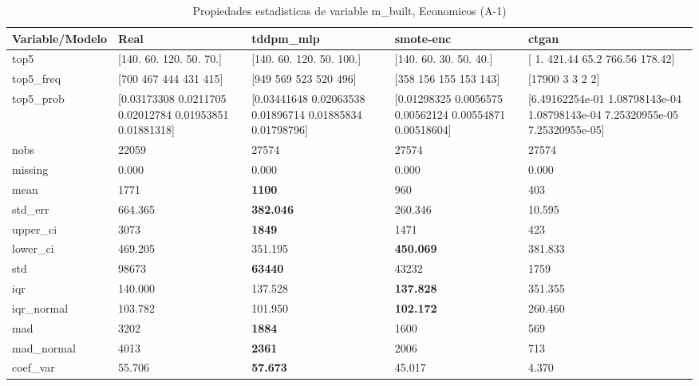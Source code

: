 \begin{table}[H]
\centering
\fontsize{8}{14}\selectfont
\caption{Propiedades  estadisticas de variable m\_built, Economicos (A-1)}
\label{table-stats-economicos-a-1-m_built}
\begin{tabular}{|l|m{10em}|m{10em}|m{10em}|m{10em}|}
\hline
 \rowcolor[gray]{0.8}
Variable/Modelo & Real & tddpm\_mlp & smote-enc & ctgan \\
\hline top5 & [140.  60. 120.  50.  70.] & [140.  60. 120.  50. 100.] & [140.  60.  30.  50.  40.] & [  1.   421.44  65.2  766.56 178.42] \\
\hline top5\_freq & [700 467 444 431 415] & [949 569 523 520 496] & [358 156 155 153 143] & [17900     3     3     2     2] \\
\hline top5\_prob & [0.03173308 0.0211705  0.02012784 0.01953851 0.01881318] & [0.03441648 0.02063538 0.01896714 0.01885834 0.01798796] & [0.01298325 0.0056575  0.00562124 0.00554871 0.00518604] & [6.49162254e-01 1.08798143e-04 1.08798143e-04 7.25320955e-05
 7.25320955e-05] \\
\hline nobs & 22059 & 27574 & 27574 & 27574 \\
\hline missing & 0.000 & 0.000 & 0.000 & 0.000 \\
\hline mean & 1771 & \bfseries 1100 & 960 & \cellcolor[rgb]{0.9, 0.54, 0.52} 403 \\
\hline std\_err & 664.365 & \bfseries 382.046 & 260.346 & \cellcolor[rgb]{0.9, 0.54, 0.52} 10.595 \\
\hline upper\_ci & 3073 & \bfseries 1849 & 1471 & \cellcolor[rgb]{0.9, 0.54, 0.52} 423 \\
\hline lower\_ci & 469.205 & \cellcolor[rgb]{0.9, 0.54, 0.52} 351.195 & \bfseries 450.069 & 381.833 \\
\hline std & 98673 & \bfseries 63440 & 43232 & \cellcolor[rgb]{0.9, 0.54, 0.52} 1759 \\
\hline iqr & 140.000 & 137.528 & \bfseries 137.828 & \cellcolor[rgb]{0.9, 0.54, 0.52} 351.355 \\
\hline iqr\_normal & 103.782 & 101.950 & \bfseries 102.172 & \cellcolor[rgb]{0.9, 0.54, 0.52} 260.460 \\
\hline mad & 3202 & \bfseries 1884 & 1600 & \cellcolor[rgb]{0.9, 0.54, 0.52} 569 \\
\hline mad\_normal & 4013 & \bfseries 2361 & 2006 & \cellcolor[rgb]{0.9, 0.54, 0.52} 713 \\
\hline coef\_var & 55.706 & \bfseries 57.673 & 45.017 & \cellcolor[rgb]{0.9, 0.54, 0.52} 4.370 \\

\end{tabular}
\end{table}
